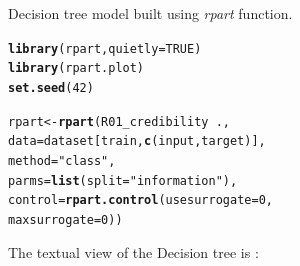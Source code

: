 \documentclass{article}\usepackage[]{graphicx}\usepackage[]{color}
\makeatletter
\newcommand{\hlnum}[1]{\textcolor[rgb]{0.686,0.059,0.569}{#1}}%
\newcommand{\hlstr}[1]{\textcolor[rgb]{0.192,0.494,0.8}{#1}}%
\newcommand{\hlopt}[1]{\textcolor[rgb]{0,0,0}{#1}}%
\newcommand{\hlstd}[1]{\textcolor[rgb]{0.345,0.345,0.345}{#1}}%
\newcommand{\hlkwb}[1]{\textcolor[rgb]{0.69,0.353,0.396}{#1}}%
\newcommand{\hlkwc}[1]{\textcolor[rgb]{0.333,0.667,0.333}{#1}}%
\newcommand{\hlkwd}[1]{\textcolor[rgb]{0.737,0.353,0.396}{\textbf{#1}}}%
\newenvironment{kframe}{%
 \def\at@end@of@kframe{}%
 \ifinner\ifhmode%
  \def\at@end@of@kframe{\end{minipage}}%
  \begin{minipage}{\columnwidth}%
 \fi\fi%
 \def\FrameCommand##1{\hskip\@totalleftmargin \hskip-\fboxsep
 \colorbox{shadecolor}{##1}\hskip-\fboxsep
     \hskip-\linewidth \hskip-\@totalleftmargin \hskip\columnwidth}%
 \MakeFramed {\advance\hsize-\width
   \@totalleftmargin\z@ \linewidth\hsize
   \@setminipage}}%
 {\par\unskip\endMakeFramed%
 \at@end@of@kframe}
\newenvironment{knitrout}{}{} %
\makeatother
\begin{document}
Decision tree model built using \textit{rpart} function.
\begin{knitrout}
\color{fgcolor}\begin{kframe}
\begin{alltt}
\hlkwd{library}\hlstd{(rpart,} \hlkwc{quietly}\hlstd{=}\hlnum{TRUE}\hlstd{)}
\hlkwd{library}\hlstd{(rpart.plot)}
\hlkwd{set.seed}\hlstd{(}\hlnum{42}\hlstd{)}

\hlstd{rpart} \hlkwb{<-} \hlkwd{rpart}\hlstd{(R01_credibility} \hlopt{~} \hlstd{.,}
                   \hlkwc{data}\hlstd{=dataset[train,} \hlkwd{c}\hlstd{(input, target)],}
                   \hlkwc{method}\hlstd{=}\hlstr{"class"}\hlstd{,}
                   \hlkwc{parms}\hlstd{=}\hlkwd{list}\hlstd{(}\hlkwc{split}\hlstd{=}\hlstr{"information"}\hlstd{),}
                   \hlkwc{control}\hlstd{=}\hlkwd{rpart.control}\hlstd{(}\hlkwc{usesurrogate}\hlstd{=}\hlnum{0}\hlstd{,}
                                         \hlkwc{maxsurrogate}\hlstd{=}\hlnum{0}\hlstd{))}
\end{alltt}
\end{kframe}
\end{knitrout}
The textual view of the Decision tree is :
\end{document}
